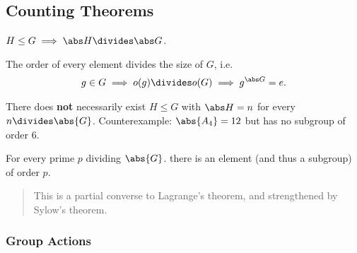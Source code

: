 \hypertarget{counting-theorems}{%
\subsection{Counting Theorems}\label{counting-theorems}}

\begin{theorem}

\(H \leq G \implies \abs H \divides \abs G\).

\end{theorem}

\begin{corollary}

The order of every element divides the size of \(G\), i.e.
\begin{align*}
  g\in G \implies o(g) \divides o(G) \implies g^{\abs G} = e
  .\end{align*}

\end{corollary}

\begin{warning}

There does \textbf{not} necessarily exist \(H \leq G\) with
\(\abs H = n\) for every \(n \divides \abs{G}\). Counterexample:
\(\abs{A_4} = 12\) but has no subgroup of order 6.

\end{warning}

\begin{theorem}

For every prime \(p\) dividing \(\abs{G}\). there is an element (and
thus a subgroup) of order \(p\).

\end{theorem}

\begin{quote}
This is a partial converse to Lagrange's theorem, and strengthened by
Sylow's theorem.
\end{quote}

\hypertarget{group-actions}{%
\subsubsection{Group Actions}\label{group-actions}}

